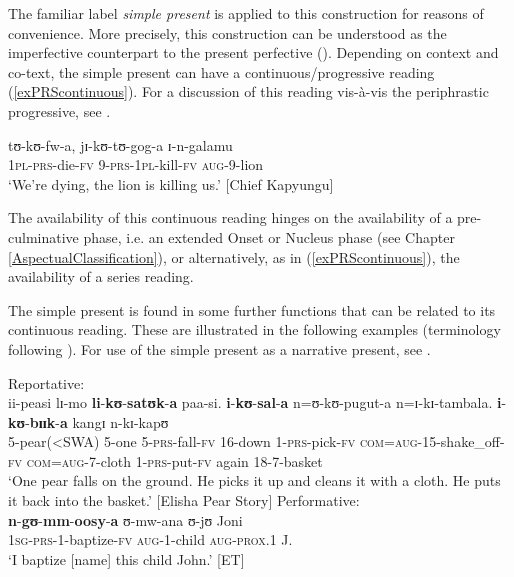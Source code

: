 The familiar label \textit{simple present} is applied to this construction for reasons of convenience. More precisely, this construction can be understood as the imperfective counterpart to the present perfective (). Depending on context and co-text, the simple present can have a continuous/progressive reading (\ref{exPRScontinuous}). For a discussion of this reading vis-à-vis the periphrastic progressive, see .

\begin{exe}
\ex \label{exPRScontinuous}\gll tʊ-kʊ-fw-a, jɪ-kʊ-tʊ-gog-a ɪ-n-galamu\\
\textsc{1pl}-\textsc{prs}-die-\textsc{fv} 9-\textsc{prs}-\textsc{1pl}-kill-\textsc{fv} \textsc{aug}-9-lion\\
\glt `We're dying, the lion is killing us.' [Chief Kapyungu]
\end{exe}

The availability of this continuous reading hinges on the availability of a pre-culminative phase, i.e. an extended Onset or Nucleus phase (see Chapter \ref{AspectualClassification}), or alternatively, as in (\ref{exPRScontinuous}), the availability of a series reading.

The simple present is found in some further functions that can be related to its continuous reading. These are illustrated in the following examples (terminology following \citealt[247]{BinnickR1991}). For use of the simple present as a narrative present, see .

\begin{exe}
\ex Reportative:\\
\gll ii-peasi lɪ-mo \textbf{li}-\textbf{kʊ}-\textbf{satʊk}-\textbf{a} paa-si. \textbf{i}-\textbf{kʊ}-\textbf{sal}-\textbf{a} n=ʊ-kʊ-pugut-a n=ɪ-kɪ-tambala. \textbf{i}-\textbf{kʊ}-\textbf{bɪɪk}-\textbf{a} kangɪ n-kɪ-kapʊ\\
5-pear(<SWA) 5-one 5-\textsc{prs}-fall-\textsc{fv} 16-down 1-\textsc{prs}-pick-\textsc{fv} \textsc{com}=\textsc{aug}-15-shake\_off-\textsc{fv} \textsc{com}=\textsc{aug}-7-cloth 1-\textsc{prs}-put-\textsc{fv} again 18-7-basket\\
\glt `One pear falls on the ground. He picks it up and cleans it with a cloth. He puts it back into the basket.' [Elisha Pear Story]
\ex Performative:\\
\gll \textbf{n}-\textbf{gʊ}-\textbf{mm}-\textbf{oosy}-\textbf{a} ʊ-mw-ana ʊ-jʊ Joni\\ \textsc{1sg}-\textsc{prs}-1-baptize-\textsc{fv} \textsc{aug}-1-child \textsc{aug}-\textsc{prox.1} J.\\
\glt `I baptize [name] this child John.' [ET]
\end{exe}

